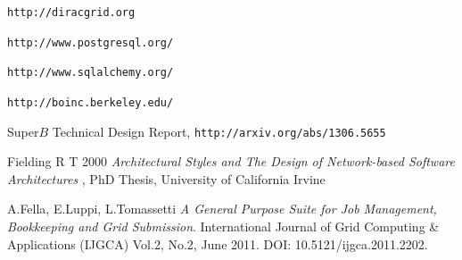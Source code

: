 \documentclass[journal]{IEEEtran}
\begin{document}
%
%
%
\begin{thebibliography}{1}

\verb"http://diracgrid.org"

\verb"http://www.postgresql.org/"

\verb"http://www.sqlalchemy.org/"

\verb"http://boinc.berkeley.edu/"

Super$B$ Technical Design Report, \verb"http://arxiv.org/abs/1306.5655"

Fielding R T 2000 {\it Architectural Styles and The Design of Network-based
Software Architectures }, PhD Thesis, University of California Irvine

A.Fella, E.Luppi, L.Tomassetti \emph{A General Purpose Suite for Job Management, Bookkeeping and Grid Submission}. International Journal of Grid Computing \& Applications (IJGCA) Vol.2, No.2, June 2011. DOI: 10.5121/ijgca.2011.2202.

\end{thebibliography}


\end{document}
